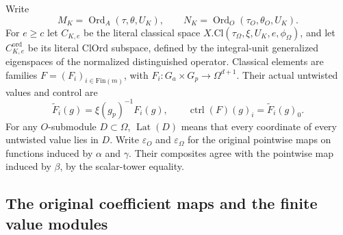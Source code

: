 Write
\[
 M_K=\operatorname{Ord}_A(\tau,\theta,U_K),\qquad
 N_K=\operatorname{Ord}_O(\tau_O,\theta_O,U_K).
\]
For $e\geq c$ let $C_{K,e}$ be the literal classical space
$X.\mathrm{Cl}(\tau_\Omega,\xi,U_K,e,\phi_\Omega)$,
and let $C^{\mathrm{ord}}_{K,e}$ be its literal
$\mathrm{ClOrd}$ subspace, defined by the integral-unit
generalized eigenspaces of the normalized distinguished
operator.  Classical elements are families
$F=(F_i)_{i\in\mathrm{Fin}(m)}$, with
$F_i:G_a\times G_p\to\Omega^{d+1}$.
Their actual untwisted values and control are
\begin{equation}\label{eq:smp-untwisted}
 \widetilde F_i(g)=\xi(g_p)^{-1}F_i(g),\qquad
 \operatorname{ctrl}(F)(g)_i=\widetilde F_i(g)_0.
\end{equation}
For any $O$-submodule $D\subset\Omega$,
$\operatorname{Lat}(D)$ means that every coordinate of
every untwisted value lies in $D$.
Write $\varepsilon_O$ and $\varepsilon_\Omega$ for the
original pointwise maps on functions induced by $\alpha$
and $\gamma$.  Their composites agree with the pointwise
map induced by $\beta$, by the scalar-tower equality.

\subsection{The original coefficient maps and the finite value modules}

